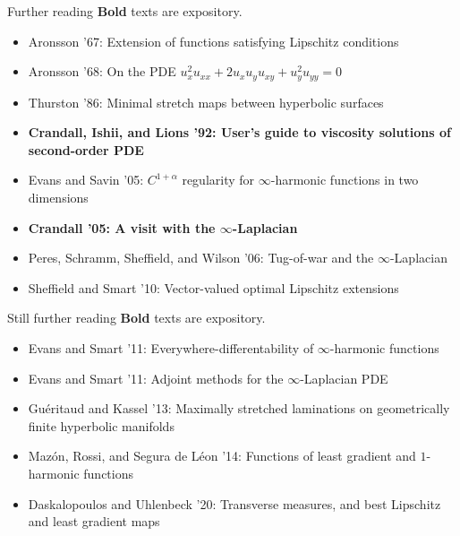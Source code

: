 \documentclass[10pt]{beamer}
\begin{document}
\begin{frame}{Further reading}
\textbf{Bold} texts are expository.
\begin{itemize}
\item Aronsson '67: Extension of functions satisfying Lipschitz conditions
\item Aronsson '68: On the PDE $u_x^2 u_{xx} + 2u_xu_yu_{xy} + u_y^2 u_{yy} = 0$
\item Thurston '86: Minimal stretch maps between hyperbolic surfaces 
\item \textbf{Crandall, Ishii, and Lions '92: User's guide to viscosity solutions of second-order PDE}
\item Evans and Savin '05: $C^{1+\alpha}$ regularity for $\infty$-harmonic functions in two dimensions
\item \textbf{Crandall '05: A visit with the $\infty$-Laplacian}
\item Peres, Schramm, Sheffield, and Wilson '06: Tug-of-war and the $\infty$-Laplacian
\item Sheffield and Smart '10: Vector-valued optimal Lipschitz extensions
\end{itemize}
\end{frame}

\begin{frame}{Still further reading}
\textbf{Bold} texts are expository.
\begin{itemize}
\item Evans and Smart '11: Everywhere-differentability of $\infty$-harmonic functions 
\item Evans and Smart '11: Adjoint methods for the $\infty$-Laplacian PDE
\item Gu\'eritaud and Kassel '13: Maximally stretched laminations on geometrically finite hyperbolic manifolds
\item Maz\'on, Rossi, and Segura de L\'eon '14: Functions of least gradient and $1$-harmonic functions
\item Daskalopoulos and Uhlenbeck '20: Transverse measures, and best Lipschitz and least gradient maps 
\end{itemize}
\end{frame}
\end{document}
